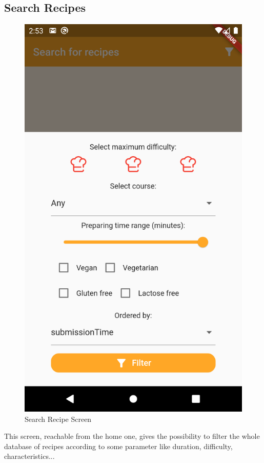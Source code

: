 \subsection{Search Recipes}
\begin{figure}[H]
	\centering
	\includegraphics{img/Filter.png}
	\caption{Search Recipe Screen}
\end{figure}
This screen, reachable from the home one, gives the possibility to filter the whole database of recipes according to some parameter like duration, difficulty, characteristics...
